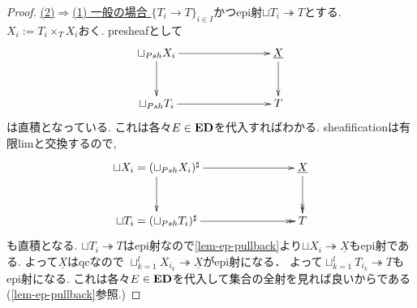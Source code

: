 \documentclass[dvipdfmx,a4paper,11pt]{article}
\theoremstyle{definition}
\begin{document}
\begin{proof}
\underline{(2)$\Rightarrow$(1) 一般の場合 }
$\{ T_i \to T\}_{i \in I}$かつepi射$\sqcup T_i \twoheadrightarrow T$とする. 
$X_i := T_i \times_{T} X_i$おく. 
presheafとして
\begin{equation*}
\xymatrix@C=80pt@R=30pt{
\sqcup_{Psh} X_i  \ar@{->}[r]\ar@{->}[d]
&\underline{X} \ar@{->}[d] \\
\sqcup_{Psh} T_i \ar@{->}[r]
&T \\   
}
\end{equation*}
は直積となっている. 
これは各々$E \in {\bf ED}$を代入すればわかる.
sheafificationは有限limと交換するので, 
\begin{equation*}
\xymatrix@C=80pt@R=30pt{
\sqcup X_i  =(\sqcup_{Psh} X_i )^{\sharp} \ar@{->}[r]\ar@{->}[d]
&\underline{X} \ar@{->>}[d] \\
\sqcup T_i  = (\sqcup_{Psh} T_i )^{\sharp}\ar@{->>}[r]
&T \\   
}
\end{equation*}
も直積となる. 
$\sqcup T_i \twoheadrightarrow T$はepi射なので\ref{lem-ep-pullback}より$\sqcup X_i \twoheadrightarrow \underline{X}$もepi射である.
よって$\underline{X}$はqcなので
$\sqcup_{k=1}^{l} X_{i_k} \twoheadrightarrow \underline{X}$がepi射になる．
よって$\sqcup_{k=1}^{l}T_{i_k} \twoheadrightarrow T$もepi射になる.
 これは各々$E \in {\bf ED}$を代入して集合の全射を見れば良いからである(\ref{lem-ep-pullback}参照.)
 \end{proof}
 
\end{document}
